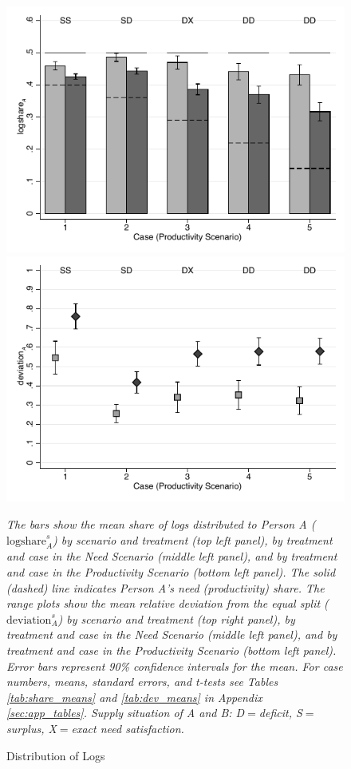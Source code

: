 \documentclass[smallcondensed]{svjour3}
\begin{document}
\begin{figure}[ht!]
   \includegraphics[scale=0.4]{figures/main_share_productivity.pdf}\includegraphics[scale=0.4]{figures/main_deviation_productivity.pdf}
   \begin{minipage}{12cm}
   \footnotesize
   \emph{The bars show the mean share of logs distributed to Person A ($\mbox{logshare}_A^s$) by scenario and treatment (top left panel), by treatment and case in the Need Scenario (middle left panel), and by treatment and case in the Productivity Scenario (bottom left panel). The solid (dashed) line indicates Person A's need (productivity) share. The range plots show the mean relative deviation from the equal split ($\mbox{deviation}_A^s$) by scenario and treatment (top right panel), by treatment and case in the Need Scenario (middle left panel), and by treatment and case in the Productivity Scenario (bottom left panel). Error bars represent 90\% confidence intervals for the mean. For case numbers, means, standard errors, and t-tests see Tables \ref{tab:share_means} and \ref{tab:dev_means} in Appendix \ref{sec:app_tables}. Supply situation of A and B: D$=$deficit, S$=$surplus, X$=$exact need satisfaction.}
   \caption{Distribution of Logs}
   \label{fig:distribution}
\end{minipage}
\end{figure}
\end{document}
